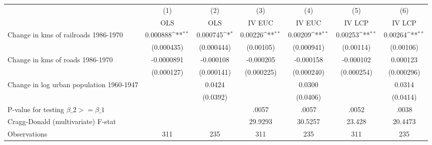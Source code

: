 {
\def\sym#1{\ifmmode^{#1}\else\(^{#1}\)\fi}
\begin{tabular}{l*{6}{c}}
\hline\hline
                &\multicolumn{1}{c}{(1)}&\multicolumn{1}{c}{(2)}&\multicolumn{1}{c}{(3)}&\multicolumn{1}{c}{(4)}&\multicolumn{1}{c}{(5)}&\multicolumn{1}{c}{(6)}\\
                &\multicolumn{1}{c}{OLS}&\multicolumn{1}{c}{OLS}&\multicolumn{1}{c}{IV EUC}&\multicolumn{1}{c}{IV EUC}&\multicolumn{1}{c}{IV LCP}&\multicolumn{1}{c}{IV LCP}\\
\hline
Change in kms of railroads 1986-1970& 0.000888\sym{**} & 0.000745\sym{*}  &  0.00226\sym{**} &  0.00209\sym{**} &  0.00253\sym{**} &  0.00264\sym{**} \\
                &(0.000435)         &(0.000444)         &(0.00105)         &(0.000941)         &(0.00114)         &(0.00106)         \\
[1em]
Change in kms of roads 1986-1970&-0.0000891         &-0.000108         &-0.000205         &-0.000158         &-0.000102         & 0.000123         \\
                &(0.000127)         &(0.000141)         &(0.000225)         &(0.000240)         &(0.000254)         &(0.000296)         \\
[1em]
Change in log urban population 1960-1947&                  &   0.0424         &                  &   0.0300         &                  &   0.0314         \\
                &                  & (0.0392)         &                  & (0.0406)         &                  & (0.0414)         \\
\hline
P-value for testing $\beta\_{2} >= \beta\_{1}$&                  &                  &    .0057         &    .0057         &    .0052         &    .0038         \\
Cragg-Donald (multivariate) F-stat&                  &                  &  29.9293         &  30.5257         &   23.428         &  20.4473         \\
Observations    &      311         &      235         &      311         &      235         &      311         &      235         \\
\hline\hline
\end{tabular}
}
